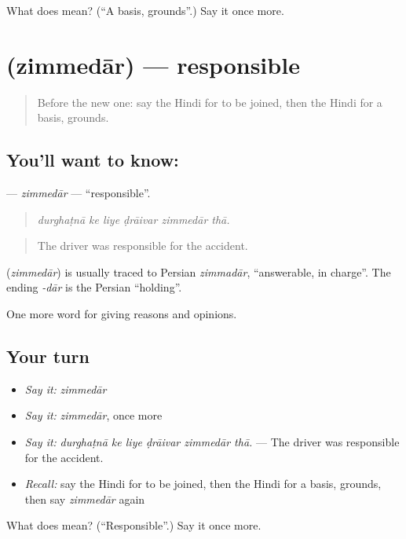 \begin{tcolorbox}[breakable,colback=teal!4,colframe=teal!35!black,title={Before you move on}]
What does  mean? (\textquotedblleft{}A basis, grounds\textquotedblright{}.) Say it once more.
\end{tcolorbox}
\section[\texorpdfstring{\hi{ज़िम्मेदार} (zimmedār)}{ज़िम्मेदार (zimmedār)}]{ (zimmedār) — responsible}

\label{lesson:HI-C343-zimmedar}



\begin{quote}
Before the new one: say the Hindi for to be joined, then the Hindi for a basis, grounds.
\end{quote}

\subsection*{You'll want to know: }
\textbf{} — \emph{zimmedār} — \textquotedblleft{}responsible\textquotedblright{}.

\begin{quote}
     
\end{quote}

\begin{quote}
\emph{durghaṭnā ke liye ḍrāivar zimmedār thā.}
\end{quote}

\begin{quote}
The driver was responsible for the accident.
\end{quote}

\begin{cousinweb}
\textbf{} (\emph{zimmedār}) is usually traced to Persian \emph{zimmadār}, \textquotedblleft{}answerable, in charge\textquotedblright{}. The ending \emph{-dār} is the Persian \textquotedblleft{}holding\textquotedblright{}.
\end{cousinweb}

\begin{grammarlens}[title={What you've built}]
One more word for giving reasons and opinions.
\end{grammarlens}

\subsection*{Your turn}
\begin{itemize}
\raggedright
  \item \emph{Say it:} \emph{zimmedār}
  \item \emph{Say it:} \emph{zimmedār}, once more
  \item \emph{Say it:} \emph{durghaṭnā ke liye ḍrāivar zimmedār thā.} — The driver was responsible for the accident.
  \item \emph{Recall:} say the Hindi for to be joined, then the Hindi for a basis, grounds, then say \emph{zimmedār} again
\end{itemize}

\begin{tcolorbox}[breakable,colback=teal!4,colframe=teal!35!black,title={Before you move on}]
What does  mean? (\textquotedblleft{}Responsible\textquotedblright{}.) Say it once more.
\end{tcolorbox}
